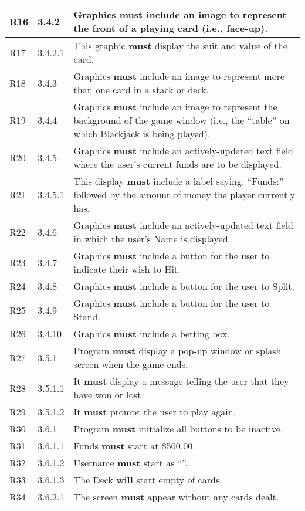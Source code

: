 \documentclass{article}
\begin{document}
\begin{tabular}{|l|l|p{5in}|}
R16 & 3.4.2 & Graphics \textbf{must} include an image to represent the front of a playing card (i.e., face-up).   \\\hline
R17 & 3.4.2.1 & This graphic \textbf{must} display the suit and value of the card. \\\hline
R18 & 3.4.3 & Graphics \textbf{must} include an image to represent more than one card in a stack or deck.   \\\hline
R19 & 3.4.4 & Graphics \textbf{must} include an image to represent the background of the game window (i.e., the “table” on which Blackjack is being played).   \\\hline
R20 & 3.4.5 & Graphics \textbf{must} include an actively-updated text field where the user’s current funds are to be displayed. \\\hline
R21 & 3.4.5.1 & This display \textbf{must} include a label saying: “Funds:” followed by the amount of money the player currently has. \\\hline
R22 & 3.4.6 & Graphics \textbf{must} include an actively-updated text field in which the user’s Name is displayed. \\\hline
R23 & 3.4.7 & Graphics \textbf{must} include a button for the user to indicate their wish to Hit. \\\hline
R24 & 3.4.8 & Graphics \textbf{must} include a button for the user to Split. \\\hline
R25 & 3.4.9 & Graphics \textbf{must} include a button for the user to Stand. \\\hline
R26 & 3.4.10 & Graphics \textbf{must} include a betting box. \\\hline
R27 & 3.5.1 & Program \textbf{must} display a pop-up window or splash screen when the game ends. \\\hline
R28 & 3.5.1.1 & It \textbf{must} display a message telling the user that they have won or lost \\\hline
R29 & 3.5.1.2 & It \textbf{must} prompt the user to play again. \\\hline
R30 & 3.6.1 & Program \textbf{must} initialize all buttons to be inactive. \\\hline
R31 & 3.6.1.1 & Funds \textbf{must}  start at \$500.00. \\\hline
R32 & 3.6.1.2 & Username \textbf{must}  start as ``''. \\\hline
R33 & 3.6.1.3 & {The Deck \textbf{will} start empty of cards.} \\\hline
R34 & 3.6.2.1 & The screen \textbf{must} appear without any cards dealt. \\\hline

\end{tabular}
\end{document}
